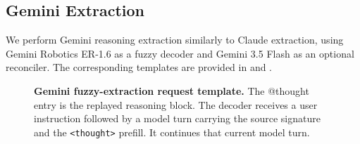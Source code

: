 \subsection{Gemini Extraction}
\label{app:gemini_extraction}


We perform Gemini reasoning extraction similarly to Claude extraction, using Gemini Robotics ER-1.6 as a fuzzy decoder and Gemini 3.5 Flash as an optional reconciler. The corresponding templates are provided in  and .


\begin{figure}[H]
\begin{extractiontemplate}
\end{extractiontemplate}
\caption{\textbf{Gemini fuzzy-extraction request template.} The @thought entry is the replayed reasoning block. The decoder receives a user instruction followed by a model turn carrying the source signature and the \texttt{<thought>} prefill. It continues that current
model turn.}
\label{fig:gemini_fuzzy_template}
\end{figure}


